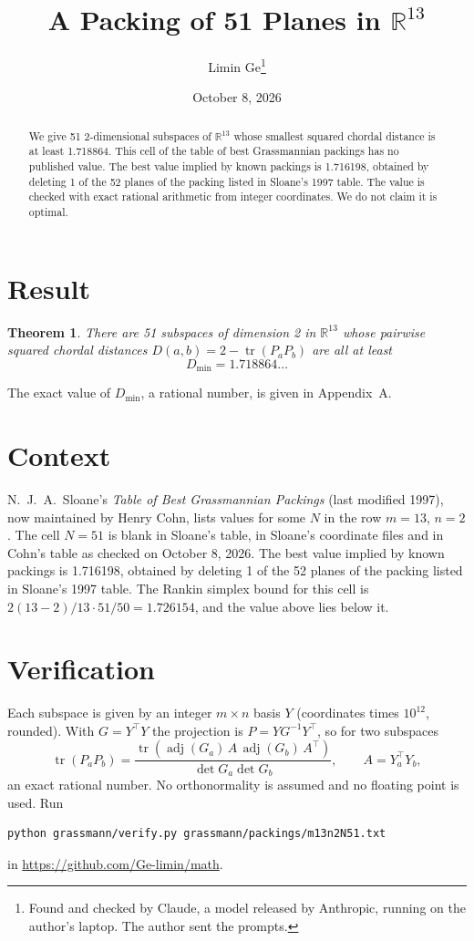 \documentclass[11pt,a4paper]{article}
\title{A Packing of 51 Planes in $\mathbb{R}^{13}$}
\author{Limin Ge\thanks{Found and checked by Claude, a model released by Anthropic, running on the author's laptop. The author sent the prompts.}}
\date{October 8, 2026}
\newtheorem*{theorem}{Theorem}
\begin{document}
\maketitle
\begin{abstract}
We give 51 2-dimensional subspaces of $\mathbb{R}^{13}$ whose smallest squared chordal distance is at least 1.718864. This cell of the table of best Grassmannian packings has no published value. The best value implied by known packings is 1.716198, obtained by deleting 1 of the 52 planes of the packing listed in Sloane's 1997 table. The value is checked with exact rational arithmetic from integer coordinates. We do not claim it is optimal.
\end{abstract}

\section{Result}
\begin{theorem}
There are 51 subspaces of dimension 2 in $\mathbb{R}^{13}$ whose pairwise squared chordal distances $D(a,b) = 2 - \operatorname{tr}(P_aP_b)$ are all at least
\[ D_{\min} = 1.718864\ldots \]
\end{theorem}
The exact value of $D_{\min}$, a rational number, is given in Appendix~A.


\section{Context}
N.~J.~A.~Sloane's \emph{Table of Best Grassmannian Packings} (last modified 1997), now maintained by Henry Cohn, lists values for some $N$ in the row $m=13$, $n=2$. The cell $N=51$ is blank in Sloane's table, in Sloane's coordinate files and in Cohn's table as checked on October 8, 2026. The best value implied by known packings is 1.716198, obtained by deleting 1 of the 52 planes of the packing listed in Sloane's 1997 table. The Rankin simplex bound for this cell is $2(13-2)/13\cdot 51/50 = 1.726154$, and the value above lies below it.


\section{Verification}
Each subspace is given by an integer $m\times n$ basis $Y$ (coordinates times $10^{12}$, rounded). With $G=Y^\top Y$ the projection is $P=YG^{-1}Y^\top$, so for two subspaces
\[ \operatorname{tr}(P_aP_b)=\frac{\operatorname{tr}(\operatorname{adj}(G_a)\,A\,\operatorname{adj}(G_b)\,A^\top)}{\det G_a\det G_b},\qquad A=Y_a^\top Y_b, \]
an exact rational number. No orthonormality is assumed and no floating point is used. Run
\begin{verbatim}
python grassmann/verify.py grassmann/packings/m13n2N51.txt
\end{verbatim}
in \url{https://github.com/Ge-limin/math}.
\end{document}
